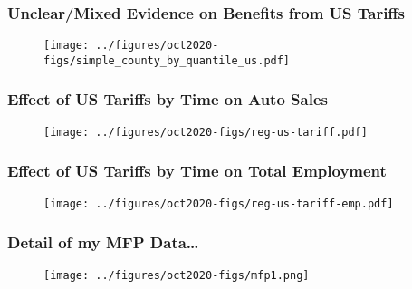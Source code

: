 \documentclass[9pt,pdftex,aspectratio=1610]{beamer}
\theoremstyle{definition}
\begin{document}
\begin{frame}[t]
\frametitle{Unclear/Mixed Evidence on Benefits from US Tariffs}
\begin{figure}[t]
\centerline{\texttt{[image: ../figures/oct2020-figs/simple\_county\_by\_quantile\_us.pdf]}}
\end{figure}
\end{frame}

\begin{frame}[t]
\frametitle{Effect of US Tariffs by Time on Auto Sales}
\begin{figure}[t]
\centerline{\texttt{[image: ../figures/oct2020-figs/reg-us-tariff.pdf]}}
\end{figure}
\end{frame}

\begin{frame}[t]
\frametitle{Effect of US Tariffs by Time on Total Employment}
\begin{figure}[t]
\centerline{\texttt{[image: ../figures/oct2020-figs/reg-us-tariff-emp.pdf]}}
\end{figure}
\end{frame}




\begin{frame}[t]
\frametitle{Detail of my MFP Data\ldots}
\begin{figure}[t]
\centerline{\texttt{[image: ../figures/oct2020-figs/mfp1.png]}}
\end{figure}
\end{frame}

\end{document}
